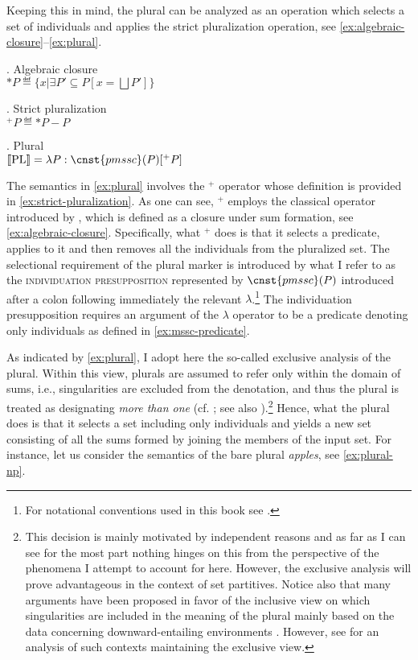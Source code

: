 	Keeping this in mind, the plural can be analyzed as an operation which selects a set of  individuals and applies the strict pluralization operation, see \ref{ex:algebraic-closure}--\ref{ex:plural}. 
	
    \ex. Algebraic closure \citep[see][]{link1983logical}\\
    $\text{*}P \eqdef \{x | \exists P' \subseteq P[x = \bigsqcup P']\}$
    \label{ex:algebraic-closure}
    
    \ex. Strict pluralization\\
	${}^+P \eqdef \text{*}P - P$\label{ex:strict-pluralization}
    
	\ex. Plural\\
	$\llbracket \text{PL}\rrbracket = \lambda P : \cnst{pmssc}(P) [{}^+P]$\label{ex:plural}
	
	The semantics in \ref{ex:plural} involves the ${}^+$ operator whose definition is provided in \ref{ex:strict-pluralization}. As one can see, ${}^+$ employs the classical \text{*} operator introduced by \citet{link1983logical}, which is defined as a closure under sum formation, see \ref{ex:algebraic-closure}. Specifically, what ${}^+$ does is that it selects a predicate, applies \text{*} to it and then removes all the  individuals from the pluralized set. The selectional requirement of the plural marker is introduced by what I refer to as the \textsc{individuation presupposition} represented by $\cnst{pmssc}(P)$ introduced after a colon following immediately the relevant $\lambda$.\footnote{For notational conventions used in this book see  .} The individuation presupposition requires an argument of the $\lambda$ operator to be a predicate denoting only  individuals as defined in \ref{ex:mssc-predicate}.
	
	As indicated by \ref{ex:plural}, I adopt here the so-called exclusive analysis of the plural. Within this view, plurals are assumed to refer only within the domain of sums, i.e., singularities are excluded from the denotation, and thus the plural is treated as designating \textit{more than one} (cf. \citealt{hoeksema1983plurality,chierchia1998plurality,chierchia1998reference,grimm2013plurality}; see also \citealt{wagiel2017pairs}).\footnote{This decision is mainly motivated by independent reasons and as far as I can see for the most part nothing hinges on this from the perspective of the phenomena I attempt to account for here.  However, the exclusive analysis will prove advantageous in the context of set partitives. Notice also that many arguments have been proposed in favor of the inclusive view on which singularities are included in the meaning of the plural mainly based on the data concerning downward-entailing environments \citep[see, e.g.,][]{link1983logical,schwarzschild1991meaning,landman2000events,sauerland_et_al2005plural,spector2007aspects,zweig2009number}. However, see \citet{grimm2013plurality} for an analysis of such contexts maintaining the exclusive view.} Hence, what the plural does is that it selects a set including only  individuals and yields a new set consisting of all the sums formed by joining the members of the input set. For instance, let us consider the semantics of the bare plural \textit{apples}, see \ref{ex:plural-np}. 
	

